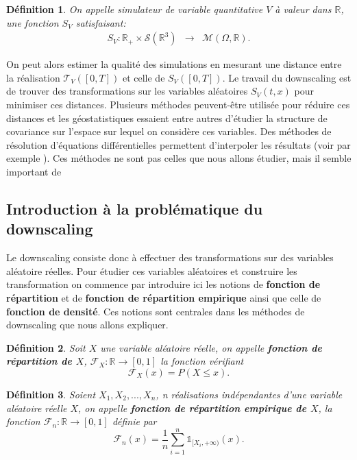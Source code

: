 \documentclass[a4paper,11pt]{article}
\newtheorem{definition}{Définition}
\begin{document}
\begin{definition}
	\label{simu_terre}
	On appelle simulateur de variable quantitative $V$ à valeur dans $\mathbb{R}$, une fonction $S_V$ satisfaisant:
	\begin{equation}
		\begin{array}{ccc}
			S_V: \mathbb{R}_{+}\times\mathcal{S}(\mathbb{R}^{3}) & \to & \mathcal{M}(\Omega,\mathbb{R}).
		\end{array}
	\end{equation}
\end{definition}
On peut alors estimer la qualité des simulations en mesurant une distance entre la réalisation $\mathcal{T}_V([0,T])$ et celle de $S_V([0,T])$. Le travail du downscaling est de trouver des transformations sur les variables aléatoires $S_V(t,x)$ pour minimiser ces distances. Plusieurs méthodes peuvent-être utilisée pour réduire ces distances et les géostatistiques essaient entre autres d'étudier la structure de covariance sur l'espace sur lequel on considère ces variables. Des méthodes de résolution d'équations différentielles permettent d'interpoler les résultats (voir par exemple \cite{lindgren2011explicit}). Ces méthodes ne sont pas celles que nous allons étudier, mais il semble important de  

\subsection{Introduction à la problématique du downscaling}
\label{intro-dwnsc}
Le downscaling consiste donc à effectuer des transformations sur des variables aléatoire réelles. Pour étudier ces variables aléatoires et construire les transformation on commence par introduire ici les notions de \textbf{fonction de répartition} et de \textbf{fonction de répartition empirique} ainsi que celle de \textbf{fonction de densité}. Ces notions sont centrales dans les méthodes de downscaling que nous allons expliquer.

\begin{definition}
	Soit $X$ une variable aléatoire réelle, on appelle \textbf{fonction de répartition de $X$}, $\mathcal{F}_{X}: \mathbb{R}\to [0,1]$ la fonction vérifiant
	\begin{equation}
		\mathcal{F}_{X}(x)=P(X\leq x).
	\end{equation}
\end{definition}

\begin{definition}
	Soient $X_1,X_2,...,X_n$, n réalisations indépendantes d'une variable aléatoire réelle $X$, on appelle \textbf{fonction de répartition empirique de $X$}, la fonction $\mathcal{F}_{n}:\mathbb{R}\to [0,1]$ définie par
	\begin{equation}
		\mathcal{F}_{n}(x)= \frac{1}{n}\sum_{i=1}^{n}\mathds{1}_{[X_i, +\infty )}(x).
	\end{equation}
\end{definition}
\end{document}
